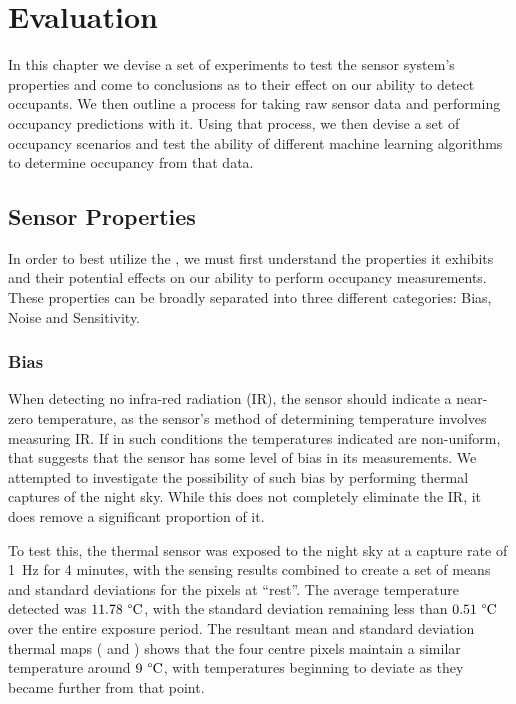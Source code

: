\documentclass[../thesis/thesis.tex]{subfiles}
\begin{document}
 \chapter{Evaluation}
 \label{chap:evaluation}

In this chapter we devise a set of experiments to test the sensor system's properties and come to conclusions as to their effect on our ability to detect occupants. We then outline a process for taking raw sensor data and performing occupancy predictions with it. Using that process, we then devise a set of occupancy scenarios and test the ability of different machine learning algorithms to determine occupancy from that data.

\section{Sensor Properties}

In order to best utilize the \mlx, we must first understand the properties it exhibits and their potential effects on our ability to perform occupancy measurements. These properties can be broadly separated into three different categories: Bias, Noise and Sensitivity.

\subsection{Bias}
When detecting no infra-red radiation (IR), the sensor should indicate a near-zero temperature, as the sensor's method of determining temperature involves measuring IR. If in such conditions the temperatures indicated are non-uniform, that suggests that the sensor has some level of bias in its measurements. We attempted to investigate the possibility of such bias by performing thermal captures of the night sky. While this does not completely eliminate the IR, it does remove a significant proportion of it.

To test this, the thermal sensor was exposed to the night sky at a capture rate of 1~Hz for 4 minutes, with the sensing results combined to create a set of means and standard deviations for the pixels at ``rest''. The average temperature detected was $11.78~\degree\textrm{C}$, with the standard deviation remaining less than $0.51~\degree\textrm{C}$ over the entire exposure period. The resultant mean and standard deviation thermal maps ( and ) shows that the four centre pixels maintain a similar temperature around $9~\degree\textrm{C}$, with temperatures beginning to deviate as they became further from that point.
\end{document}
